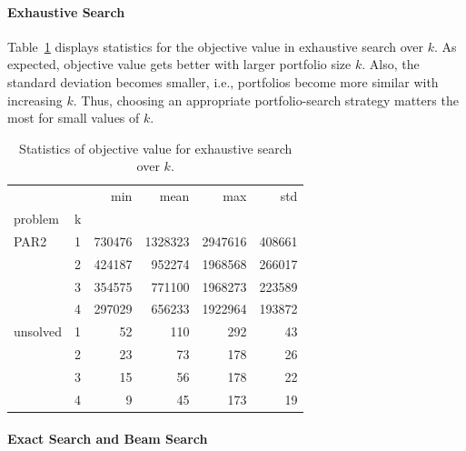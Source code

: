 \documentclass[conference]{IEEEtran}
\begin{document}
\paragraph{Exhaustive Search}

Table~\ref{tab:objective-exhaustive} displays statistics for the objective value in exhaustive search over $k$.
As expected, objective value gets better with larger portfolio size $k$.
Also, the standard deviation becomes smaller, i.e., portfolios become more similar with increasing $k$.
Thus, choosing an appropriate portfolio-search strategy matters the most for small values of $k$.

\begin{table}[t]
	\centering
	\caption{Statistics of objective value for exhaustive search over $k$.}
	\label{tab:objective-exhaustive}
	\begin{tabular}{llrrrr}
		\toprule
		&   &     min &     mean &      max &     std \\
		problem & k &         &          &          &         \\
		\midrule
		PAR2 & 1 &  730476 &  1328323 &  2947616 &  408661 \\
		& 2 &  424187 &   952274 &  1968568 &  266017 \\
		& 3 &  354575 &   771100 &  1968273 &  223589 \\
		& 4 &  297029 &   656233 &  1922964 &  193872 \\
		unsolved & 1 &      52 &      110 &      292 &      43 \\
		& 2 &      23 &       73 &      178 &      26 \\
		& 3 &      15 &       56 &      178 &      22 \\
		& 4 &       9 &       45 &      173 &      19 \\
		\bottomrule
	\end{tabular}
\end{table}

\paragraph{Exact Search and Beam Search}
\end{document}
